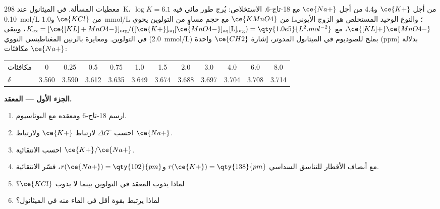 \begin{problem}
\label{pb:b3:supramolecular:1}
معطيات المسألة. في الميثانول عند \qty{298}{K}، $\log K = 6.1$ من أجل $\ce{K+}$ و4.4 من أجل $\ce{Na+}$ مع
18-تاج-6. الاستخلاص: يُرج طور مائي فيه \qty{0.10}{mol/L} من $\ce{KCl}$ و\qty{1.0}{mmol/L} من $\ce{KMnO4}$
مع حجم مساوٍ من التولوين يحوي  L؛ والنوع الوحيد المستخلص
هو الزوج الأيوني $\ce{[KL]+}\ce{MnO4-}$، مع
$K_{\mathrm{ex}} = [\ce{[KL]+MnO4-}]_{\mathrm{org}}/([\ce{K+}]_{\mathrm{aq}}[\ce{MnO4-}]_{\mathrm{aq}}[\mathrm L]_{\mathrm{org}}) = \qty{1.0e5}{L^2.mol^{-2}}$، ويبقى  في التولوين. ومعايرة بالرنين المغناطيسي النووي
 (\qty{2.0}{mmol/L}) بملح للصوديوم في الميثانول المدوتر، إشارة $\ce{CH2}$ واحدة
(ppm) بدلالة مكافئات $\ce{Na+}$:

\begin{center}\small
\begin{tabular}{l*{11}{c}}
\hline
مكافئات & 0 & 0.25 & 0.5 & 0.75 & 1.0 & 1.5 & 2.0 & 3.0 & 4.0 & 6.0 & 8.0\\
$\delta$ & 3.560 & 3.590 & 3.612 & 3.635 & 3.649 & 3.674 & 3.688 & 3.697 & 3.704 & 3.708 & 3.714\\
\hline
\end{tabular}
\end{center}

\medskip\noindent\textbf{الجزء الأول --- المعقد.}
\begin{enumerate}
  \item ارسم 18-تاج-6 ومعقده مع البوتاسيوم.
  \item احسب $\Delta G^\circ$ لارتباط $\ce{K+}$ ولارتباط $\ce{Na+}$.
  \item احسب الانتقائية $\ce{K+}/\ce{Na+}$.
  \item مع أنصاف الأقطار للتناسق السداسي $r(\ce{K+}) = \qty{138}{pm}$ و$r(\ce{Na+}) = \qty{102}{pm}$، فسّر الانتقائية.
  \item لماذا يذوب المعقد في التولوين بينما لا يذوب $\ce{KCl}$؟
  \item لماذا يرتبط  بقوة أقل في الماء منه في الميثانول؟
\end{enumerate}


\end{problem}
